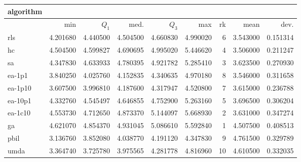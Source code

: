 \begin{tabular}{@{}l*{5}{>{{}}N{1}{2}}>{{}}N{2}{0}>{{}}N{1}{2}>{{}}N{1}{2}@{}}
\toprule
{algorithm} &  &  \\
\midrule
& {min} & {$Q_1$} & {med.} & {$Q_3$} & {max} & {rk} & {mean} & {dev.} \\
\midrule
rls & 4.201680 & 4.440500 & 4.504500 & 4.660830 & 4.990020 & 6 & 3.543000 & 0.151314 \\
 hc & 4.504500 & 4.599827 & 4.690695 & 4.995020 & 5.446620 & 4 & 3.506000 & 0.211247 \\
 sa & 4.347830 & 4.633933 & 4.780395 & 4.921782 & 5.285410 & 3 & 3.623500 & 0.270930 \\
 ea-1p1 & 3.840250 & 4.025760 & 4.152835 & 4.340635 & 4.970180 & 8 & 3.546000 & 0.311658 \\
 ea-1p10 & 3.607500 & 3.996810 & 4.187600 & 4.317947 & 4.520800 & 7 & 3.615000 & 0.236788 \\
 ea-10p1 & 4.332760 & 4.545497 & 4.646855 & 4.752900 & 5.263160 & 5 & 3.696500 & 0.306204 \\
 ea-1c10 & 4.553730 & 4.712650 & 4.873370 & {\color{blue}} 5.144097 & {\color{blue}} 5.668930 & 2 & 3.631000 & 0.347274 \\
 ga & {\color{blue}} 4.621070 & {\color{blue}} 4.854370 & {\color{blue}} 4.931045 & 5.086610 & 5.592840 & 1 & 4.507500 & 0.408513 \\
 pbil & 3.136760 & 3.852080 & 4.038770 & 4.191120 & 4.347830 & 9 & 4.761500 & 0.329789 \\
 umda & 3.364740 & 3.725780 & 3.975565 & 4.281778 & 4.816960 & 10 & 4.610500 & 0.332035 \\
 \bottomrule
\end{tabular}
